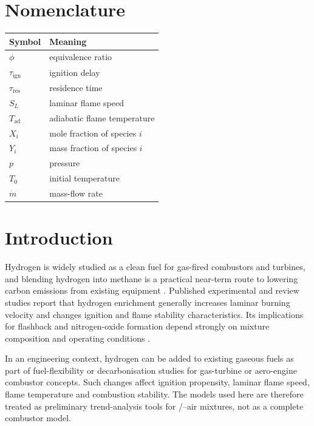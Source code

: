 \documentclass[11pt]{article}
\begin{document}
\section*{Nomenclature}
\begin{center}
  \begin{tabular}{ll}
    \toprule
    Symbol & Meaning \\
    \midrule
    $\phi$ & equivalence ratio \\
    $\tau_\mathrm{ign}$ & ignition delay \\
    $\tau_\mathrm{res}$ & residence time \\
    $S_L$ & laminar flame speed \\
    $T_\mathrm{ad}$ & adiabatic flame temperature \\
    $X_i$ & mole fraction of species $i$ \\
    $Y_i$ & mass fraction of species $i$ \\
    $p$ & pressure \\
    $T_0$ & initial temperature \\
    $\dot{m}$ & mass-flow rate \\
    \bottomrule
  \end{tabular}
\end{center}

\clearpage

\section{Introduction}
Hydrogen is widely studied as a clean fuel for gas-fired combustors and
turbines, and blending hydrogen into methane is a practical near-term route to
lowering carbon emissions from existing equipment \citep{bdaiwi2024}.
Published experimental and review studies report that hydrogen enrichment
generally increases laminar burning velocity and changes ignition and flame
stability characteristics. Its implications for flashback and nitrogen-oxide
formation depend strongly on mixture composition and operating conditions
\citep{li2017,bdaiwi2024}.

In an engineering context, hydrogen can be added to existing gaseous fuels as
part of fuel-flexibility or decarbonisation studies for gas-turbine or
aero-engine combustor concepts. Such changes affect ignition propensity,
laminar flame speed, flame temperature and combustion stability. The models
used here are therefore treated as preliminary trend-analysis tools for
/--air mixtures, not as a complete combustor model.
\end{document}
